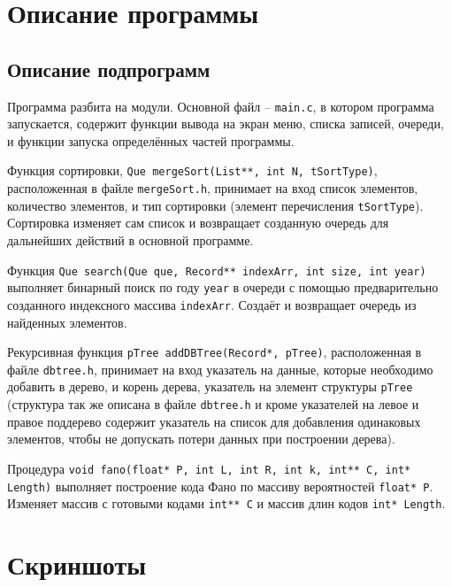 \documentclass[fleqn]{article}
\begin{document}

\section{Описание программы}

\subsection{Описание подпрограмм}

Программа разбита на модули. Основной файл -- \verb+main.c+, 
в котором программа запускается, содержит функции вывода 
на экран меню, списка записей, очереди, и функции
запуска определённых частей программы.

Функция сортировки, \verb+Que mergeSort(List**, int N, tSortType)+,
расположенная в файле \verb+mergeSort.h+,
принимает на вход список элементов, количество элементов, и тип
сортировки (элемент перечисления \verb"tSortType"). Сортировка изменяет сам список и возвращает созданную очередь для дальнейших
действий в основной программе.

Функция \verb"Que search(Que que, Record** indexArr, int size, int year)"
выполняет бинарный поиск по году \verb+year+ в очереди 
с помощью предварительно созданного индексного массива 
\verb"indexArr".
Создаёт и возвращает очередь из найденных элементов.

Рекурсивная функция \verb"pTree addDBTree(Record*, pTree)",
расположенная в файле \verb"dbtree.h",
принимает на вход указатель на данные, которые необходимо
добавить в дерево, и корень дерева, указатель на элемент
структуры \verb+pTree+ (структура так же описана в файле
\verb"dbtree.h" и кроме указателей на левое и правое
поддерево содержит указатель на список для добавления
одинаковых элементов, чтобы не допускать
потери данных при построении дерева).

Процедура \verb"void fano(float* P, int L, int R, int k, int** C, int* Length)"
выполняет построение кода Фано по массиву вероятностей \verb"float* P".
Изменяет массив с готовыми кодами \verb"int** C" и массив
длин кодов \verb"int* Length".


\newpage

\section{Скриншоты}
\end{document}
